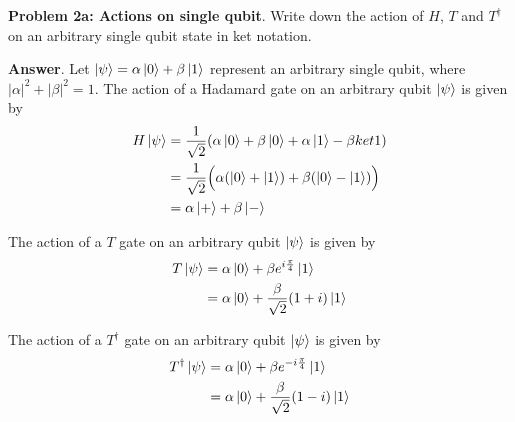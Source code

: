 \textbf{Problem 2a: Actions on single qubit}. Write down the action of $H$, $T$ and $T^\dag$ on an arbitrary single qubit state in ket notation.


\textbf{Answer}. Let $\ket{\psi} = \alpha\ket{0} + \beta\ket{1}$ represent an arbitrary single qubit, where $|\alpha|^2 + |\beta|^2 = 1$. 
The action of a Hadamard gate on an arbitrary qubit $\ket{\psi}$ is given by
\begin{align*}
	H\ket{\psi} &= \frac{1}{\sqrt{2}}(\alpha \ket{0} + \beta \ket{0} + \alpha \ket{1} - \beta ket{1})  \\
	&= \frac{1}{\sqrt{2}}\Big(\alpha(\ket{0} + \ket{1}) + \beta(\ket{0} - \ket{1})\Big)  \\
	&= \alpha \ket{+} + \beta \ket{-}
\end{align*}

The action of a $T$ gate on an arbitrary qubit $\ket{\psi}$ is given by
\begin{align*}
	T\ket{\psi} &= \alpha \ket{0} + \beta e^{i \frac{\pi}{4}} \ket{1} \\
	& = \alpha \ket{0} + \frac{\beta}{\sqrt{2}} (1 + i) \ket{1}
\end{align*}

The action of a $T^\dag$ gate on an arbitrary qubit $\ket{\psi}$ is given by
\begin{align*}
	T^\dag\ket{\psi} &= \alpha \ket{0} + \beta e^{-i \frac{\pi}{4}} \ket{1} \\
	& = \alpha \ket{0} + \frac{\beta}{\sqrt{2}} (1 - i) \ket{1}
\end{align*}

